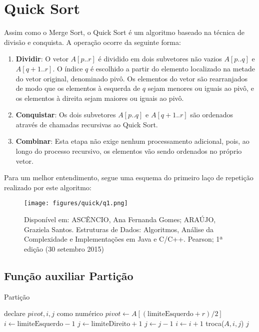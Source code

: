 \section{Quick Sort}
\label{sec:quick-sort-teo}

Assim como o Merge Sort, o Quick Sort é um algoritmo baseado na técnica de divisão e conquista. A operação ocorre da seguinte forma:

\begin{enumerate}
	\item \textbf{Dividir}: O vetor \( A[p..r] \) é dividido em dois subvetores não vazios \( A[p..q] \) e \( A[q+1..r] \). O índice \( q \) é escolhido a partir do elemento localizado na metade do vetor original, denominado pivô. Os elementos do vetor são rearranjados de modo que os elementos à esquerda de \( q \) sejam menores ou iguais ao pivô, e os elementos à direita sejam maiores ou iguais ao pivô.

	\item \textbf{Conquistar}: Os dois subvetores \( A[p..q] \) e \( A[q+1..r] \) são ordenados através de chamadas recursivas ao Quick Sort.

	\item \textbf{Combinar}: Esta etapa não exige nenhum processamento adicional, pois, ao longo do processo recursivo, os elementos vão sendo ordenados no próprio vetor.
\end{enumerate}

Para um melhor entendimento, segue uma esquema do primeiro laço de repetição realizado por este algoritmo:

\begin{figure}[!ht]
	\centering
	\texttt{[image: figures/quick/q1.png]}
	\caption{Disponível em: ASCÊNCIO, Ana Fernanda Gomes; ARAÚJO, Graziela Santos. Estruturas de Dados: Algoritmos, Análise da Complexidade e Implementações em Java e C/C++.  Pearson; 1ª edição (30 setembro 2015)}
	\label{fig:quick_sort_example}
\end{figure}

\subsection{Função auxiliar Partição}

\begin{algorithm}
	\caption{Partição}
	\label{algo:particao}
	\begin{algorithmic}[1]
		\State declare $pivot, i, j$ como numérico
		\State $pivot \gets A[(\text{limiteEsquerdo} + r) / 2]$
		\State $i \gets \text{limiteEsquerdo}- 1$
		\State $j \gets \text{limiteDireito} + 1$
		\Repeat
		\State $j \gets j - 1$
		\Repeat
		\State $i \gets i + 1$
		\State troca($A, i, j$)
		\EndIf
		\EndWhile
		\State \Return $j$
		\EndFunction
		\Statex
	\end{algorithmic}
\end{algorithm}

